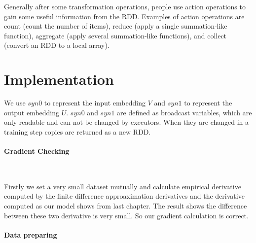 Generally after some transformation operations, people use action operations to gain some useful information from the RDD. Examples of action operations are count (count the number of items), reduce (apply a single summation-like function), aggregate (apply several summation-like functions), and collect (convert an RDD to a local array). 
 


\section{Implementation}

We use $syn0$ to represent the input embedding $V$ and $syn1$ to represent the output embedding $U$. $syn0$ and $syn1$ are defined as broadcast variables, which are only readable and can not be changed by executors. When they are changed in a training step copies are returned as a new RDD. 

\paragraph{Gradient Checking}\

Firstly we set a very small dataset mutually and calculate empirical derivative computed by the finite difference approaximation derivatives and the derivative computed as our model shows from last chapter. The result shows the difference between these two derivative is very small. So our gradient calculation is correct.

\paragraph{Data preparing} \

